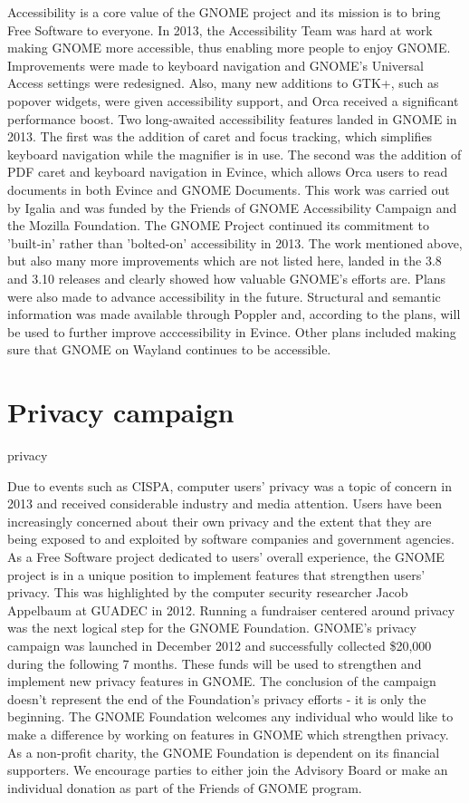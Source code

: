 \documentclass{scrreprt}
\begin{document}
Accessibility is a core value of the GNOME project and its mission is to bring Free Software to everyone. In 2013, the Accessibility Team was hard at work making GNOME more accessible, thus enabling more people to enjoy GNOME.
Improvements were made to keyboard navigation and GNOME's Universal Access settings were redesigned. Also, many new additions to GTK+, such as popover widgets, were given accessibility support, and Orca received a significant performance boost.
Two long-awaited accessibility features landed in GNOME in 2013. The first was the addition of caret and focus tracking, which simplifies keyboard navigation while the magnifier is in use. The second was the addition of PDF caret and keyboard navigation in Evince, which allows Orca users to read documents in both Evince and GNOME Documents. This work was carried out by Igalia and was funded by the Friends of GNOME Accessibility Campaign and the Mozilla Foundation.
The GNOME Project continued its commitment to 'built-in' rather than 'bolted-on' accessibility in 2013. The work mentioned above, but also many more improvements which are not listed here, landed in the 3.8 and 3.10 releases and clearly showed how valuable GNOME's efforts are.
Plans were also made to advance accessibility in the future. Structural and semantic information was made available through Poppler and, according to the plans,  will be used to further improve acccessibility in Evince. Other plans included making sure that GNOME on Wayland continues to be accessible.



\section{Privacy campaign}
privacy

Due to events such as CISPA, computer users' privacy was a topic of concern in 2013 and received considerable industry and media attention. Users have been increasingly concerned about their own privacy and the extent that they are being exposed to and exploited by software companies and government agencies.
As a Free Software project dedicated to users' overall experience, the GNOME project is in a unique position to implement features that strengthen users' privacy. This was highlighted by the computer security researcher Jacob Appelbaum at GUADEC in 2012. Running a fundraiser centered around privacy was the next logical step for the GNOME Foundation.
GNOME's privacy campaign was launched in December 2012 and successfully collected \$20,000  during the following 7 months. These funds will be used to strengthen and implement new privacy features in GNOME. The conclusion of the campaign doesn't represent the end of the Foundation's privacy efforts - it is only the beginning. The GNOME Foundation welcomes any individual who would like to make a difference by working on features in GNOME which strengthen privacy.
As a non-profit charity, the GNOME Foundation is dependent on its financial supporters. We encourage parties to either join the Advisory Board or make an individual donation as part of the Friends of GNOME program.
\end{document}
